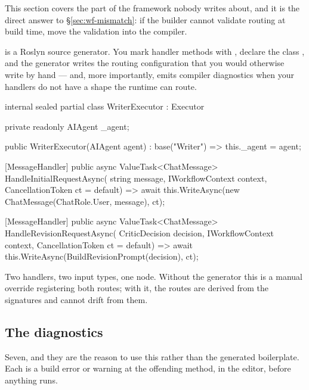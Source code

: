 This section covers the part of the framework nobody writes about, and it is the
direct answer to \S\ref{sec:wf-mismatch}: if the builder cannot validate routing
at build time, move the validation into the compiler.

 is a Roslyn source generator. You
mark handler methods with \code{[MessageHandler]}, declare the class
, and the generator writes the routing configuration that you would
otherwise write by hand --- and, more importantly, emits compiler diagnostics when
your handlers do not have a shape the runtime can route.

\begin{csharp}[caption={Multiple handlers, generated routing}, label={lst:wf-message-handler}]
internal sealed partial class WriterExecutor : Executor
{
    private readonly AIAgent _agent;

    public WriterExecutor(AIAgent agent) : base("Writer") => this._agent = agent;

    [MessageHandler]
    public async ValueTask<ChatMessage> HandleInitialRequestAsync(
        string message, IWorkflowContext context, CancellationToken ct = default)
        => await this.WriteAsync(new ChatMessage(ChatRole.User, message), ct);

    [MessageHandler]
    public async ValueTask<ChatMessage> HandleRevisionRequestAsync(
        CriticDecision decision, IWorkflowContext context, CancellationToken ct = default)
        => await this.WriteAsync(BuildRevisionPrompt(decision), ct);
}
\end{csharp}

Two handlers, two input types, one node. Without the generator this is a manual
 override registering both routes; with it, the routes are
derived from the signatures and cannot drift from them.

\subsection{The diagnostics}

Seven, and they are the reason to use this rather than the generated boilerplate.
Each is a build error or warning at the offending method, in the editor, before
anything runs.

